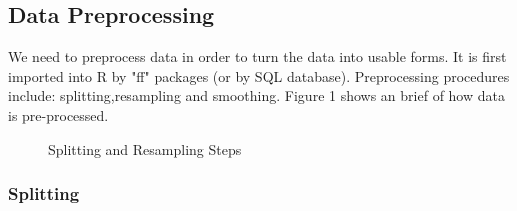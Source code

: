 \documentclass[11pt,letterpaper]{article}
\begin{document}
\subsection{Data Preprocessing}
\label{sec:data}
We need to preprocess data in order to turn the data into usable forms. It is first imported into R by "ff" packages (or by SQL database). Preprocessing procedures include: splitting,resampling and smoothing. Figure 1 shows an brief of how data is pre-processed.
\begin{figure}
	\centering
	\caption{Splitting and Resampling Steps}
\end{figure}

\subsubsection{Splitting}
\end{document}
